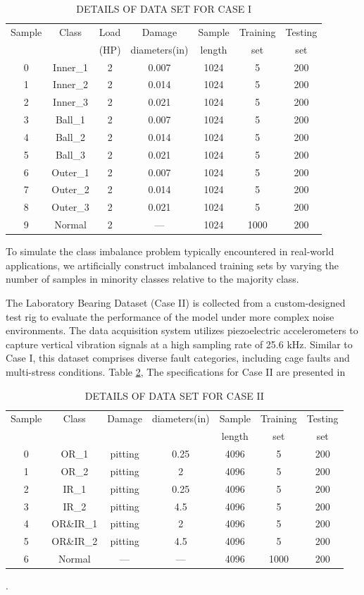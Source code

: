 \documentclass[twocolumn]{IEEEtran}
\begin{document}
\begin{table}[htbp]
\centering
\caption{DETAILS OF DATA SET FOR CASE I}
\label{tab:dataset_caseI}
\begin{tabular}{ccccccc}
\hline
Sample & Class & Load & Damage & Sample & Training & Testing \\
 & & (HP) & diameters(in) & length & set & set \\
\hline
0 & Inner\_1 & 2 & 0.007 & 1024 & 5 & 200 \\
1 & Inner\_2 & 2 & 0.014 & 1024 & 5 & 200 \\
2 & Inner\_3 & 2 & 0.021 & 1024 & 5 & 200 \\
3 & Ball\_1 & 2 & 0.007 & 1024 & 5 & 200 \\
4 & Ball\_2 & 2 & 0.014 & 1024 & 5 & 200 \\
5 & Ball\_3 & 2 & 0.021 & 1024 & 5 & 200 \\
6 & Outer\_1 & 2 & 0.007 & 1024 & 5 & 200 \\
7 & Outer\_2 & 2 & 0.014 & 1024 & 5 & 200 \\
8 & Outer\_3 & 2 & 0.021 & 1024 & 5 & 200 \\
9 & Normal & 2 & --- & 1024 & 1000 & 200 \\
\hline
\end{tabular}
\end{table}
To simulate the class imbalance problem typically encountered in real-world applications, we artificially construct imbalanced training sets by varying the number of samples in minority classes relative to the majority class.

The Laboratory Bearing Dataset (Case II) is collected from a custom-designed test rig to evaluate the performance of the model under more complex noise environments. The data acquisition system utilizes piezoelectric accelerometers to capture vertical vibration signals at a high sampling rate of 25.6 kHz. Similar to Case I, this dataset comprises diverse fault categories, including cage faults and multi-stress conditions. Table \ref{tab:dataset_caseII}, The specifications for Case II are presented in \begin{table}[htbp]
\centering
\caption{DETAILS OF DATA SET FOR CASE II}
\label{tab:dataset_caseII}
\begin{tabular}{ccccccc}
\hline
Sample & Class & Damage & diameters(in) & Sample & Training & Testing \\
 & & & & length & set & set \\
\hline
0 & OR\_1 & pitting & 0.25 & 4096 & 5 & 200 \\
1 & OR\_2 & pitting & 2 & 4096 & 5 & 200 \\
2 & IR\_1 & pitting & 0.25 & 4096 & 5 & 200 \\
3 & IR\_2 & pitting & 4.5 & 4096 & 5 & 200 \\
4 & OR\&IR\_1 & pitting & 2 & 4096 & 5 & 200 \\
5 & OR\&IR\_2 & pitting & 4.5 & 4096 & 5 & 200 \\
6 & Normal & --- & --- & 4096 & 1000 & 200 \\
\hline
\end{tabular}
\end{table}. 
\end{document}
